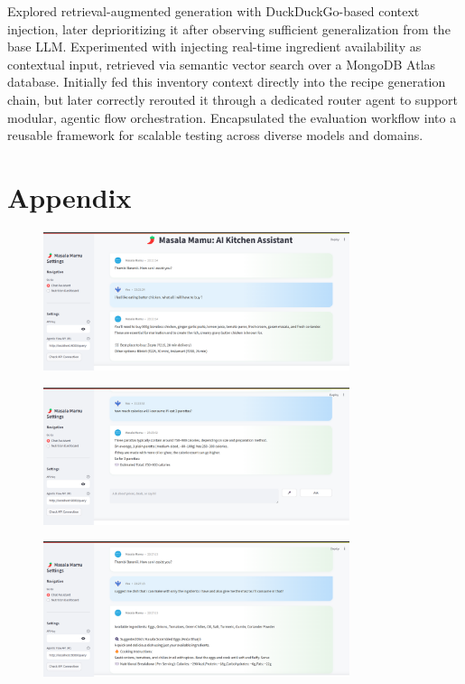 \documentclass{ecai}
\begin{document}
Explored retrieval-augmented generation with DuckDuckGo-based context injection, later deprioritizing it after observing sufficient generalization from the base LLM. Experimented with injecting real-time ingredient availability as contextual input, retrieved via semantic vector search over a MongoDB Atlas database. Initially fed this inventory context directly into the recipe generation chain, but later correctly rerouted it through a dedicated router agent to support modular, agentic flow orchestration. Encapsulated the evaluation workflow into a reusable framework for scalable testing across diverse models and domains.

\clearpage
\section*{Appendix}


\begin{figure}[h]
\centering
\includegraphics[width=0.8\textwidth]{../images/img.png}
\end{figure}

\begin{figure}[h]
\centering
\includegraphics[width=0.8\textwidth]{../images/img_1.png}
\end{figure}

\begin{figure}[h]
\centering
\includegraphics[width=0.8\textwidth]{../images/img_2.png}
\end{figure}
\end{document}
